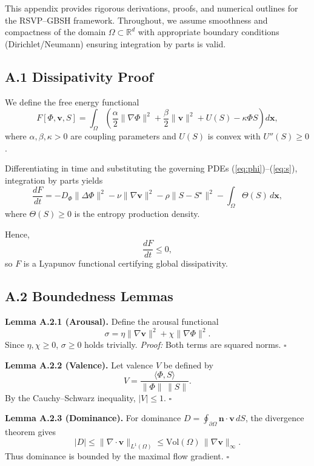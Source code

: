 \documentclass[11pt]{article}
\theoremstyle{plain}
\begin{document}
This appendix provides rigorous derivations, proofs, and numerical outlines for the RSVP--GBSH framework.  
Throughout, we assume smoothness and compactness of the domain $\Omega \subset \mathbb{R}^d$ with appropriate boundary conditions (Dirichlet/Neumann) ensuring integration by parts is valid.  

\subsection*{A.1 Dissipativity Proof}

We define the free energy functional
\[
F[\Phi,\mathbf{v},S] = \int_\Omega \left( \frac{\alpha}{2} \|\nabla \Phi\|^2 + \frac{\beta}{2} \|\mathbf{v}\|^2 + U(S) - \kappa \Phi S \right) d\mathbf{x},
\]
where $\alpha,\beta,\kappa>0$ are coupling parameters and $U(S)$ is convex with $U''(S)\geq 0$.  

Differentiating in time and substituting the governing PDEs (\ref{eq:phi})--(\ref{eq:s}), integration by parts yields
\[
\frac{dF}{dt} = - D_\Phi \|\Delta \Phi\|^2 - \nu \|\nabla \mathbf{v}\|^2 - \rho \|S-S^\star\|^2 - \int_\Omega \Theta(S)\, d\mathbf{x},
\]
where $\Theta(S)\geq 0$ is the entropy production density.  

Hence,
\[
\frac{dF}{dt} \leq 0,
\]
so $F$ is a Lyapunov functional certifying global dissipativity.

\subsection*{A.2 Boundedness Lemmas}

\textbf{Lemma A.2.1 (Arousal).}  
Define the arousal functional
\[
\sigma = \eta \|\nabla \mathbf{v}\|^2 + \chi \|\nabla \Phi\|^2.
\]
Since $\eta,\chi \geq 0$, $\sigma \geq 0$ holds trivially.  
\emph{Proof:} Both terms are squared norms. $\square$

\medskip

\textbf{Lemma A.2.2 (Valence).}  
Let valence $V$ be defined by
\[
V = \frac{\langle \Phi, S \rangle}{\|\Phi\|\,\|S\|}.
\]
By the Cauchy--Schwarz inequality, $|V| \leq 1$. $\square$

\medskip

\textbf{Lemma A.2.3 (Dominance).}  
For dominance $D = \oint_{\partial \Omega} \mathbf{n}\cdot \mathbf{v} \, dS$,  
the divergence theorem gives
\[
|D| \leq \|\nabla\cdot \mathbf{v}\|_{L^1(\Omega)} \leq \mathrm{Vol}(\Omega)\,\|\nabla \mathbf{v}\|_\infty.
\]
Thus dominance is bounded by the maximal flow gradient. $\square$
\end{document}
